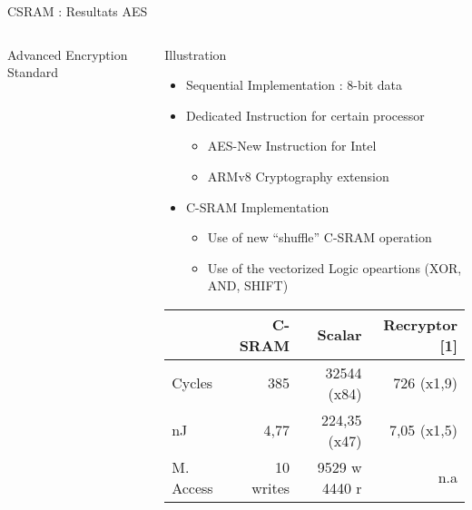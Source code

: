 \begin{Frame}{CSRAM : Resultats AES}
  \begin{columns}[t]
	\begin{column}{5cm}
      \begin{block}{Advanced Encryption Standard}
      \end{block}
	\end{column}
	\begin{column}{8cm}
      \begin{block}{Illustration}
        \begin{itemize}
        \item  Sequential Implementation : 8-bit data 
        \item Dedicated Instruction for certain processor
          \begin{itemize}
          \item AES-New Instruction for Intel
          \item ARMv8 Cryptography extension
          \end{itemize}
        \item C-SRAM Implementation
          \begin{itemize}
          \item Use of new “shuffle” C-SRAM operation
          \item Use of the vectorized Logic opeartions (XOR, AND, SHIFT)	
          \end{itemize}
        \end{itemize}
      \end{block}
      \begin{alertblock}{}\footnotesize
        \begin{tabular}{|l | r r r|}\hline
              & C-SRAM    & Scalar        & Recryptor [1]\\\hline{}
Cycles        & 385       & 32544 (x84)   & 726 (x1,9)\\
nJ            & 4,77      & 224,35 (x47)  & 7,05 (x1,5) \\
M. Access     & 10 writes & 9529 w 4440 r & n.a\\\hline
        \end{tabular}        
      \end{alertblock}
	\end{column}
\end{columns}

\end{Frame}

